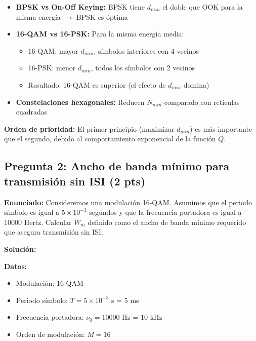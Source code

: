 \documentclass[11pt,a4paper]{article}
\begin{document}
\begin{itemize}
    \item \textbf{BPSK vs On-Off Keying:} BPSK tiene $d_{min}$ el doble que OOK para la misma energ\'ia $\to$ BPSK es \'optima
    
    \item \textbf{16-QAM vs 16-PSK:} Para la misma energ\'ia media:
    \begin{itemize}
        \item 16-QAM: mayor $d_{min}$, s\'imbolos interiores con 4 vecinos
        \item 16-PSK: menor $d_{min}$, todos los s\'imbolos con 2 vecinos
        \item Resultado: 16-QAM es superior (el efecto de $d_{min}$ domina)
    \end{itemize}
    
    \item \textbf{Constelaciones hexagonales:} Reducen $N_{min}$ comparado con ret\'iculas cuadradas
\end{itemize}

\textbf{Orden de prioridad:} El primer principio (maximizar $d_{min}$) es m\'as importante que el segundo, debido al comportamiento exponencial de la funci\'on $Q$.



\subsection*{Pregunta 2: Ancho de banda m\'inimo para transmisi\'on sin ISI (2 pts)}

\textbf{Enunciado:} Consideremos una modulaci\'on 16-QAM. Asumimos que el periodo s\'imbolo es igual a $5 \times 10^{-3}$ segundos y que la frecuencia portadora es igual a 10000 Hertz. Calcular $W_m$ definido como el ancho de banda m\'inimo requerido que asegura transmisi\'on sin ISI.

\vspace{0.3cm}
\textbf{Soluci\'on:}

\textbf{Datos:}
\begin{itemize}
    \item Modulaci\'on: 16-QAM
    \item Periodo s\'imbolo: $T = 5 \times 10^{-3}$ s = 5 ms
    \item Frecuencia portadora: $\nu_0 = 10000$ Hz = 10 kHz
    \item Orden de modulaci\'on: $M = 16$
\end{itemize}
\end{document}
